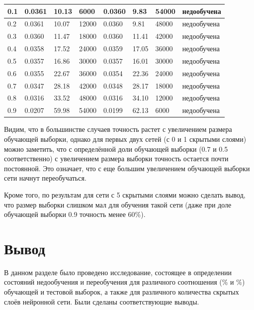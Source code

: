 \documentclass[12pt]{report}
\begin{document}
\begin{table}[!h]
\begin{center}
\begin{tabular}{|l|l|l|l|l|l|l|l|}
\hline 0.1 & 0.0361 & 10.13 & 6000 & 0.0360 & 9.83 & 54000 & недообучена \\
\hline 0.2 & 0.0361 & 10.07 & 12000 & 0.0360 & 9.81 & 48000 & недообучена \\
\hline 0.3 & 0.0360 & 11.47 & 18000 & 0.0360 & 11.41 & 42000 & недообучена \\
\hline 0.4 & 0.0358 & 17.52 & 24000 & 0.0359 & 17.05 & 36000 & недообучена \\
\hline 0.5 & 0.0357 & 16.86 & 30000 & 0.0357 & 16.01 & 30000 & недообучена \\
\hline 0.6 & 0.0355 & 22.67 & 36000 & 0.0354 & 22.36 & 24000 & недообучена \\
\hline 0.7 & 0.0347 & 28.18 & 42000 & 0.0348 & 28.17 & 18000 & недообучена \\
\hline 0.8 & 0.0316 & 33.52 & 48000 & 0.0316 & 34.10 & 12000 & недообучена \\
\hline 0.9 & 0.0207 & 59.98 & 54000 & 0.0199 & 62.13 & 6000 & недообучена \\
\hline
	\end{tabular}
	\end{center}
\end{table}


Видим, что в большинстве случаев точность растет с увеличением размера обучающей выборки, однако для первых двух сетей (с 0 и 1 скрытыми слоями) можно заметить, что с определённой доли обучающей выборки (0.7 и 0.5 соответственно) с увеличением размера выборки точность остается почти постоянной. Это означает, что с еще большим увеличением обучающей выборки сети начнут переобучаться.

Кроме того, по результам для сети с 5 скрытыми слоями можно сделать вывод, что размер выборки слишком мал для обучения такой сети (даже при доле обучающей выборки 0.9 точность менее 60\%).  

\section*{Вывод}
В данном разделе было проведено исследование, состоящее в определении состояний недообучения и переобучения для различного соотношения (\% и \%) обучающей и тестовой выборок, а также для различного количества скрытых слоёв нейронной сети. Были сделаны соответствующие выводы.
\end{document}
